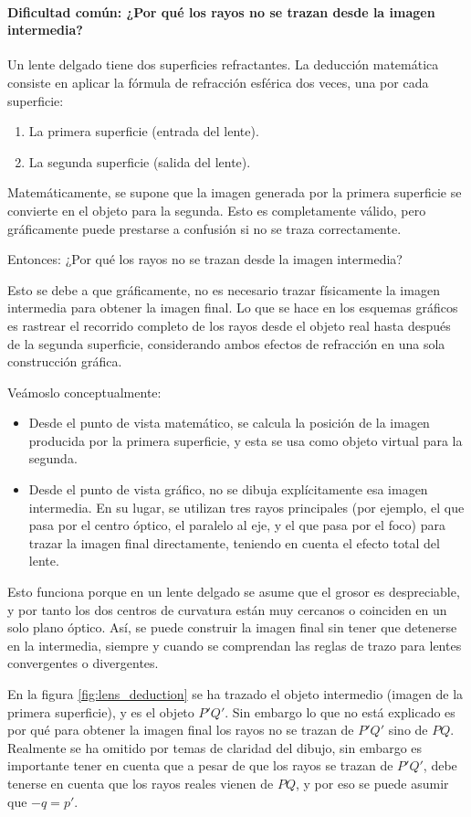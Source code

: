 \paragraph{Dificultad común: ¿Por qué los rayos no se trazan desde la imagen intermedia?}

Un lente delgado tiene dos superficies refractantes. La deducción matemática consiste en aplicar la fórmula de refracción esférica dos veces, una por cada superficie:
\begin{enumerate}
  \item La primera superficie (entrada del lente).
  \item La segunda superficie (salida del lente).
\end{enumerate}

Matemáticamente, se supone que la imagen generada por la primera superficie se convierte en el objeto para la segunda. Esto es completamente válido, pero gráficamente puede prestarse a confusión si no se traza correctamente.

Entonces: ¿Por qué los rayos no se trazan desde la imagen intermedia?

Esto se debe a que gráficamente, no es necesario trazar físicamente la imagen intermedia para obtener la imagen final. Lo que se hace en los esquemas gráficos es rastrear el recorrido completo de los rayos desde el objeto real hasta después de la segunda superficie, considerando ambos efectos de refracción en una sola construcción gráfica.

Veámoslo conceptualmente:
\begin{itemize}
  \item Desde el punto de vista matemático, se calcula la posición de la imagen producida por la primera superficie, y esta se usa como objeto virtual para la segunda.
  \item Desde el punto de vista gráfico, no se dibuja explícitamente esa imagen intermedia. En su lugar, se utilizan tres rayos principales (por ejemplo, el que pasa por el centro óptico, el paralelo al eje, y el que pasa por el foco) para trazar la imagen final directamente, teniendo en cuenta el efecto total del lente.
\end{itemize}

Esto funciona porque en un lente delgado se asume que el grosor es despreciable, y por tanto los dos centros de curvatura están muy cercanos o coinciden en un solo plano óptico. Así, se puede construir la imagen final sin tener que detenerse en la intermedia, siempre y cuando se comprendan las reglas de trazo para lentes convergentes o divergentes.

En la figura \ref{fig:lens_deduction} se ha trazado el objeto intermedio (imagen de la primera superficie), y es el objeto \(P'Q'\). Sin embargo lo que no está explicado es por qué para obtener la imagen final los rayos no se trazan de \(P'Q'\) sino de \(PQ\). Realmente se ha omitido por temas de claridad del dibujo, sin embargo es importante tener en cuenta que a pesar de que los rayos se trazan de \(P'Q'\), debe tenerse en cuenta que los rayos reales vienen de \(PQ\), y por eso se puede asumir que \(-q=p'\).